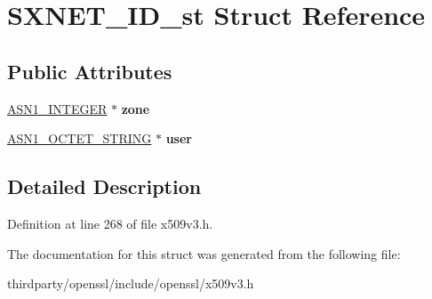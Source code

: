\hypertarget{struct_s_x_n_e_t___i_d__st}{}\section{S\+X\+N\+E\+T\+\_\+\+I\+D\+\_\+st Struct Reference}
\label{struct_s_x_n_e_t___i_d__st}
\subsection*{Public Attributes}
\begin{DoxyCompactItemize}
\item 
\mbox{\label{struct_s_x_n_e_t___i_d__st_a37185a622f9b0cb3e0384652be7b9215}} 
\hyperlink{structasn1__string__st}{A\+S\+N1\+\_\+\+I\+N\+T\+E\+G\+ER} $\ast$ {\bfseries zone}
\item 
\mbox{\label{struct_s_x_n_e_t___i_d__st_aa72978d5a59bbe0df0bb2d5190c30348}} 
\hyperlink{structasn1__string__st}{A\+S\+N1\+\_\+\+O\+C\+T\+E\+T\+\_\+\+S\+T\+R\+I\+NG} $\ast$ {\bfseries user}
\end{DoxyCompactItemize}


\subsection{Detailed Description}


Definition at line 268 of file x509v3.\+h.



The documentation for this struct was generated from the following file\+:\begin{DoxyCompactItemize}
\item 
thirdparty/openssl/include/openssl/x509v3.\+h\end{DoxyCompactItemize}
